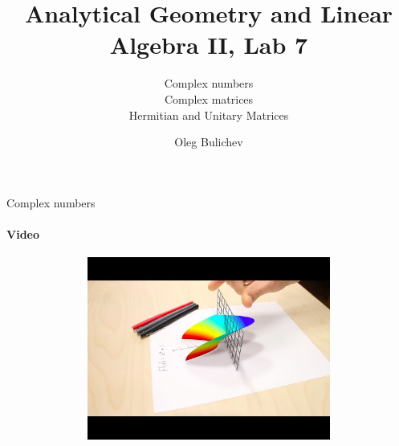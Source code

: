 \documentclass[aspectratio=169]{beamer}
\title[AGLA2]{Analytical Geometry and Linear Algebra II, Lab 7} %
\subtitle{Complex numbers \\ Complex matrices \\ Hermitian and Unitary Matrices 
         } %
\author{Oleg Bulichev}
\newcommand{\fbckg}[1]{\usebackgroundtemplate{\texttt{[image: \#1]}}}%
\begin{document}
\setlength{\abovedisplayskip}{0pt}
\setlength{\belowdisplayskip}{0pt}
\setlength{\abovedisplayshortskip}{0pt}
\setlength{\belowdisplayshortskip}{0pt}

\fbckg{fibeamer/figs/title_page.png}

\fbckg{fibeamer/figs/common.png}

\begin{frame}[t]{Complex numbers}
    \framesubtitle{Video}
    \vspace{-0.6cm}
    \begin{figure}[H]
        \href{https://youtu.be/T647CGsuOVU}{
            \centering\includegraphics[height=6cm,width=1\textwidth,keepaspectratio]{im_video.jpg}}
        \label{fig:im_video.jpg}
    \end{figure}
\end{frame}
\end{document}
